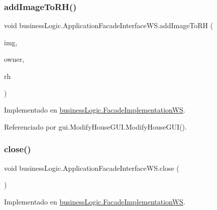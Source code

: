 \subsubsection{\texorpdfstring{addImageToRH()}{addImageToRH()}}
{\footnotesize\ttfamily void business\+Logic.\+Application\+Facade\+Interface\+W\+S.\+add\+Image\+To\+RH (\begin{DoxyParamCaption}\item[{byte \mbox{[}$\,$\mbox{]}}]{img,  }\item[{\mbox{\hyperlink{classdomain_1_1_owner}{Owner}}}]{owner,  }\item[{\mbox{\hyperlink{classdomain_1_1_rural_house}{Rural\+House}}}]{rh }\end{DoxyParamCaption})}



Implementado en \mbox{\hyperlink{classbusiness_logic_1_1_facade_implementation_w_s_aa05fbf6e32c0939508a542b857dce1d1}{business\+Logic.\+Facade\+Implementation\+WS}}.



Referenciado por gui.\+Modify\+House\+G\+U\+I.\+Modify\+House\+G\+U\+I().

\mbox{\label{interfacebusiness_logic_1_1_application_facade_interface_w_s_a8cbc91e14e6abf2d7577ba2c69f4b48f}} 
\subsubsection{\texorpdfstring{close()}{close()}}
{\footnotesize\ttfamily void business\+Logic.\+Application\+Facade\+Interface\+W\+S.\+close (\begin{DoxyParamCaption}{ }\end{DoxyParamCaption})}



Implementado en \mbox{\hyperlink{classbusiness_logic_1_1_facade_implementation_w_s_aaf150e07dd6d71319c6f2f4bf6be1647}{business\+Logic.\+Facade\+Implementation\+WS}}.

\mbox{\label{interfacebusiness_logic_1_1_application_facade_interface_w_s_ac2cbd39795e0c171a79ac440698bd859}} 
